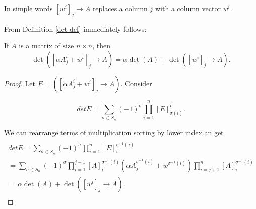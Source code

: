 \documentclass[main.tex]{subfiles}
\begin{document}
\noindent
In simple words $[w^i]_j \to A$ replaces a column $j$ with a column vector $w^i$.

\noindent
From Definition \ref{det-def} immediately follows:

\begin{theorem}
If $A$ is a matrix of size $n \times n$, then
\begin{equation}
\det([\alpha A^i_j + w^i]_j \to A) = \alpha \det(A) + \det([w^i]_j\to  A).
\end{equation}
\end{theorem}
\begin{proof}
Let $E = ([\alpha A^i_j + w^i]_j \to A)$. Consider


\begin{equation}
det E = \sum\limits_{\sigma\in S_n} (-1)^\sigma \prod_{i=1}^n [E]^i_{\sigma(i)}.
\end{equation}

We can rearrange terms of multiplication sorting by lower index an get
\begin{multline*}
\\
det E = \sum\limits_{\sigma\in S_n} (-1)^\sigma \prod_{i=1}^n [E]^{\sigma^{-1}(i)}_i 
\\=
\sum\limits_{\sigma\in S_n} (-1)^\sigma \prod_{i=1}^{j-1} [A]^{\sigma^{-1}(i)}_i (\alpha A^{\sigma^{-1}(i)}_j + w^{\sigma^{-1}(i)}) \prod_{i=j+1}^{n} [A]^{\sigma^{-1}(i)}_i 
\\ = \alpha \det(A) + \det([w^i]_j\to  A).
\\
\end{multline*}
\end{proof}
\end{document}
